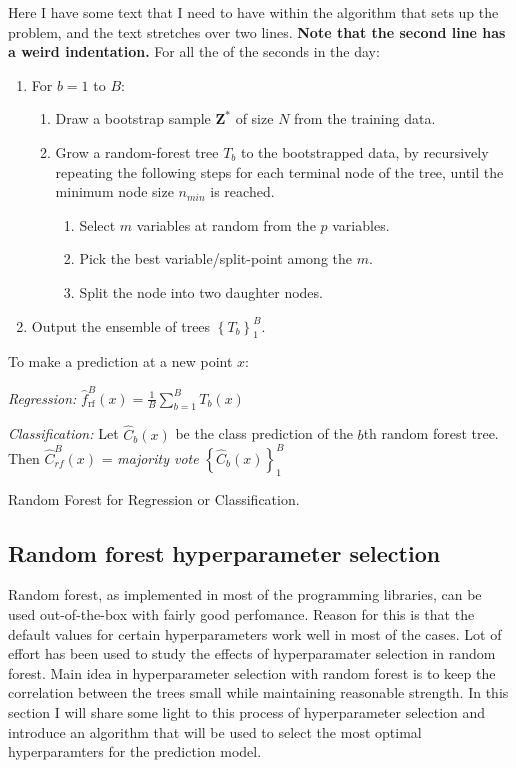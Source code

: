 \begin{algorithm}
    \footnotesize
    \begin{minipage}{.92\linewidth}
    Here I have some text that I need to have within the algorithm that
    sets up the problem, and the text stretches over two  lines.
    \textbf{Note that the second line has a weird indentation.}
    \BlankLine
    For all the of the seconds in the day:
    \begin{enumerate}
        \item For $b = 1$ to $B$:
        \begin{enumerate}
            \item Draw a bootstrap sample $\bm{Z}^{*}$ of size $N$ from the training data.
            \item Grow a random-forest tree $T_b$ to the bootstrapped data, by recursively repeating the following steps for each terminal node of the tree, until the minimum node size $n_{min}$ is reached.
            \begin{enumerate}
                \item Select $m$ variables at random from the $p$ variables.
                \item Pick the best variable/split-point among the $m$.
                \item Split the node into two daughter nodes.
            \end{enumerate}
        \end{enumerate}
        \item Output the ensemble of trees $\left\{ T _ { b } \right\} _ { 1 } ^ { B }$.
    \end{enumerate}
    To make a prediction at a new point $x$:

    \textit{Regression:} $\hat { f } _ { \mathrm { rf } } ^ { B } ( x ) = \frac { 1 } { B } \sum _ { b = 1 } ^ { B } T _ { b } ( x )$

    \textit{Classification:} Let $\hat { C } _ { b } ( x )$ be the class prediction of the $b$th random forest
    tree. Then $\hat{C} _ { r f } ^ { B } ( x )$ = \textit{majority vote} $\left\{ \hat { C } _ { b } ( x ) \right\} _ { 1 } ^ { B }$
    \end{minipage}
    \caption{\footnotesize Random Forest for Regression or Classification.}
    \label{alg:random_forest}
\end{algorithm}
\subsection{Random forest hyperparameter selection}
Random forest, as implemented in most of the programming libraries, can be used out-of-the-box with fairly good perfomance. Reason for this is that the default values for certain hyperparameters work well in most of the cases. Lot of effort has been used to study the effects of hyperparamater selection in random forest. Main idea in hyperparameter selection with random forest is to keep the correlation between the trees small while maintaining reasonable strength. In this section I will share some light to this process of hyperparameter selection and introduce an algorithm that will be used to select the most optimal hyperparamters for the prediction model.


